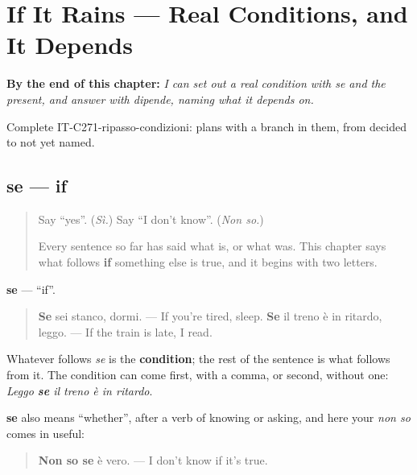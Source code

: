 
\chapter{If It Rains --- Real Conditions, and It Depends}
\label{ch:it-real-conditions}

\begin{chapteropening}
\textbf{By the end of this chapter:} \emph{I can set out a real condition with se and the present, and answer with dipende, naming what it depends on.}

Complete IT-C271-ripasso-condizioni: plans with a branch in them, from decided to not yet named.
\end{chapteropening}

\section[se]{se — if}

\label{lesson:IT-C271-se}



\begin{quote}
Say \textquotedblleft{}yes\textquotedblright{}. (\emph{Sì.}) Say \textquotedblleft{}I don't know\textquotedblright{}. (\emph{Non so.})

Every sentence so far has said what is, or what was. This chapter says what follows \textbf{if} something else is true, and it begins with two letters.
\end{quote}

\begin{grammarlens}[title={Grammar Lens: se opens a condition}]
\textbf{se} — \textquotedblleft{}if\textquotedblright{}.

\begin{quote}
\textbf{Se} sei stanco, dormi. — If you're tired, sleep. \textbf{Se} il treno è in ritardo, leggo. — If the train is late, I read.
\end{quote}

Whatever follows \emph{se} is the \textbf{condition}; the rest of the sentence is what follows from it. The condition can come first, with a comma, or second, without one: \emph{Leggo \textbf{se} il treno è in ritardo}.

\textbf{se} also means \textquotedblleft{}whether\textquotedblright{}, after a verb of knowing or asking, and here your \emph{non so} comes in useful:

\begin{quote}
\textbf{Non so se} è vero. — I don't know if it's true.
\end{quote}
\end{grammarlens}

